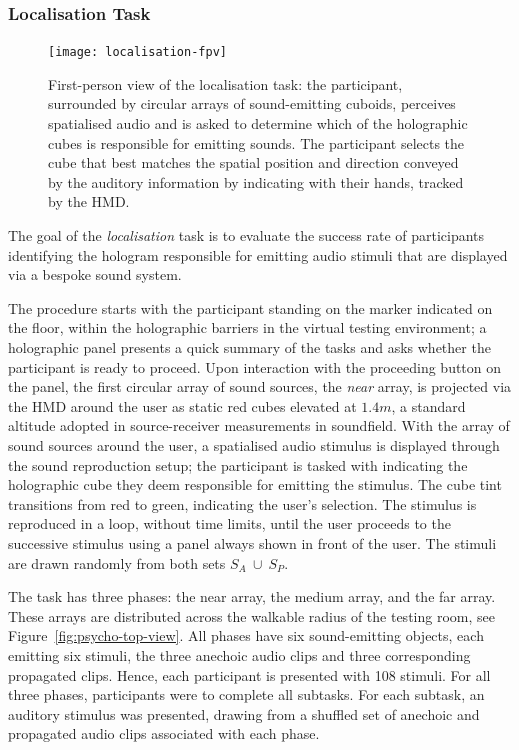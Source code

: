 \subsubsection{Localisation Task}\label{sec:localisation-task-procedure}
\begin{figure}[htbp]
    \centering
    \texttt{[image: localisation-fpv]}
    \caption{First-person view of the localisation task: the participant, surrounded by circular arrays of sound-emitting cuboids, perceives spatialised audio and is asked to determine which of the holographic cubes is responsible for emitting sounds. The participant selects the cube that best matches the spatial position and direction conveyed by the auditory information by indicating with their hands, tracked by the HMD.}
    \label{fig:localisation-fpv}
\end{figure}
The goal of the \emph{localisation} task is to evaluate the success rate of participants identifying the hologram responsible for emitting audio stimuli that are displayed via a bespoke sound system. \par
The procedure starts with the participant standing on the marker indicated on the floor, within the holographic barriers in the virtual testing environment; a holographic panel presents a quick summary of the tasks and asks whether the participant is ready to proceed. Upon interaction with the proceeding button on the panel, the first circular array of sound sources, the \emph{near} array, is projected via the HMD around the user as static red cubes elevated at $1.4m$, a standard altitude adopted in source-receiver measurements in soundfield. With the array of sound sources around the user, a spatialised audio stimulus is displayed through the sound reproduction setup; the participant is tasked with indicating the holographic cube they deem responsible for emitting the stimulus. The cube tint transitions from red to green, indicating the user's selection. The stimulus is reproduced in a loop, without time limits, until the user proceeds to the successive stimulus using a panel always shown in front of the user. The stimuli are drawn randomly from both sets $S_A~\cup~S_P$.\par
The task has three phases: the near array, the medium array, and the far array. These arrays are distributed across the walkable radius of the testing room, see Figure~\ref{fig:psycho-top-view}. All phases have six sound-emitting objects, each emitting six stimuli, the three anechoic audio clips and three corresponding propagated clips. Hence, each participant is presented with 108 stimuli. For all three phases, participants were to complete all subtasks. For each subtask, an auditory stimulus was presented, drawing from a shuffled set of anechoic and propagated audio clips associated with each phase. \par

